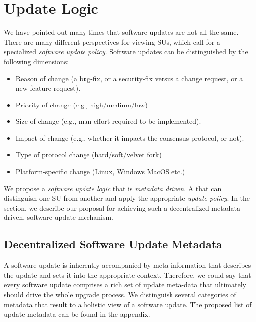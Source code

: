 \section{Update Logic}
We have pointed out many times that software updates are not all the same. There are many different perspectives for viewing SUs, which call for a specialized \emph{software update policy}. Software updates can be distinguished by the following dimensions:
\begin{itemize}
\item Reason of change (a bug-fix, or a security-fix versus a change request, or a new feature request).
\item Priority of change (e.g., high/medium/low).
\item Size of change (e.g., man-effort required to be implemented).
\item Impact of change (e.g., whether it impacts the consensus protocol, or not).
\item Type of protocol change (hard/soft/velvet fork)
\item Platform-specific change (Linux, Windows MacOS etc.)
\end{itemize}
We propose a \emph{software update logic} that is \emph{metadata driven}. A  that can distinguish one SU from another and apply the appropriate \emph{update policy}. In the section, we describe our proposal for achieving such a decentralized metadata-driven, software update mechanism.

\subsection{Decentralized Software Update Metadata} 
A software update is inherently accompanied by meta-information that describes the update and sets it into the appropriate context. Therefore, we could say that every software update comprises a rich set of update meta-data that ultimately should drive the whole upgrade process. We distinguish several categories of metadata that result to a holistic view of a software update. The proposed list of update metadata can be found in the appendix. %

